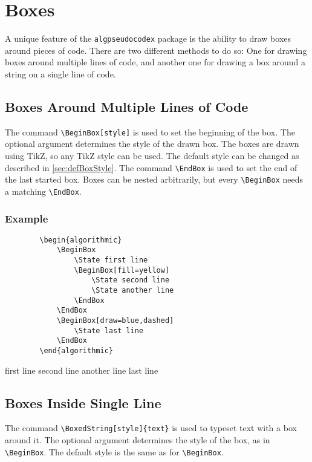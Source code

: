 \documentclass[11pt,a4paper,USenglish]{article}
\begin{document}
\section{Boxes}
A unique feature of the \texttt{algpseudocodex} package is the ability to draw boxes around pieces of code. There are two different methods to do so: One for drawing boxes around multiple lines of code, and another one for drawing a box around a string on a single line of code.

\subsection{Boxes Around Multiple Lines of Code}
The command \verb|\BeginBox[style]| is used to set the beginning of the box. The optional argument determines the style of the drawn box. The boxes are drawn using TikZ, so any TikZ style can be used. The default style can be changed as described in \cref{sec:defBoxStyle}.
The command \verb|\EndBox| is used to set the end of the last started box. Boxes can be nested arbitrarily, but every \verb|\BeginBox| needs a matching \verb|\EndBox|.

\subsubsection*{Example}
\begin{minipage}[t]{0.45\textwidth}
	\begin{verbatim}
		\begin{algorithmic}
		    \BeginBox
		        \State first line
		        \BeginBox[fill=yellow]
		            \State second line
		            \State another line
		        \EndBox
		    \EndBox
		    \BeginBox[draw=blue,dashed]
		        \State last line
		    \EndBox
		\end{algorithmic}
	\end{verbatim}
\end{minipage}
\hfill
\begin{minipage}[t]{0.45\textwidth}
	\begin{algorithmic}
		\BeginBox
			\State first line
			\BeginBox[fill=yellow]
				\State second line
				\State another line
			\EndBox
		\EndBox
		\BeginBox[draw=blue,dashed]
			\State last line
		\EndBox
	\end{algorithmic}
\end{minipage}


\subsection{Boxes Inside Single Line}
The command \verb|\BoxedString[style]{text}| is used to typeset text with a box around it. The optional argument determines the style of the box, as in \verb|\BeginBox|. The default style is the same as for \verb|\BeginBox|.
\end{document}
